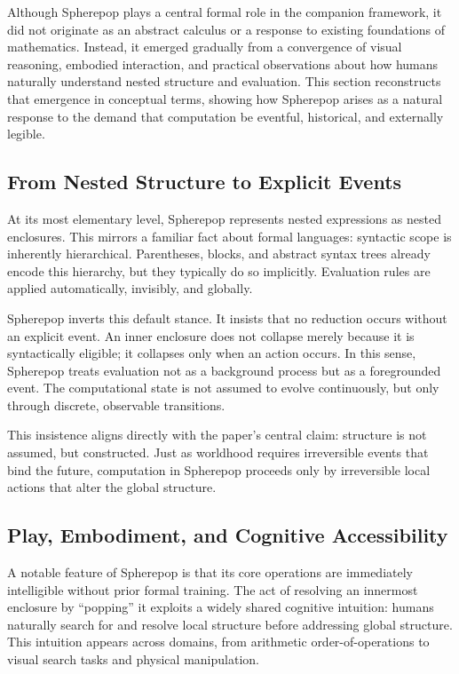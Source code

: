 \documentclass[11pt]{article}
\begin{document}
Although Spherepop plays a central formal role in the companion framework, it did not originate as an abstract calculus or a response to existing foundations of mathematics. Instead, it emerged gradually from a convergence of visual reasoning, embodied interaction, and practical observations about how humans naturally understand nested structure and evaluation. This section reconstructs that emergence in conceptual terms, showing how Spherepop arises as a natural response to the demand that computation be eventful, historical, and externally legible.

\subsection{From Nested Structure to Explicit Events}

At its most elementary level, Spherepop represents nested expressions as nested enclosures. This mirrors a familiar fact about formal languages: syntactic scope is inherently hierarchical. Parentheses, blocks, and abstract syntax trees already encode this hierarchy, but they typically do so implicitly. Evaluation rules are applied automatically, invisibly, and globally.

Spherepop inverts this default stance. It insists that no reduction occurs without an explicit event. An inner enclosure does not collapse merely because it is syntactically eligible; it collapses only when an action occurs. In this sense, Spherepop treats evaluation not as a background process but as a foregrounded event. The computational state is not assumed to evolve continuously, but only through discrete, observable transitions.

This insistence aligns directly with the paper’s central claim: structure is not assumed, but constructed. Just as worldhood requires irreversible events that bind the future, computation in Spherepop proceeds only by irreversible local actions that alter the global structure.

\subsection{Play, Embodiment, and Cognitive Accessibility}

A notable feature of Spherepop is that its core operations are immediately intelligible without prior formal training. The act of resolving an innermost enclosure by “popping” it exploits a widely shared cognitive intuition: humans naturally search for and resolve local structure before addressing global structure. This intuition appears across domains, from arithmetic order-of-operations to visual search tasks and physical manipulation.
\end{document}
